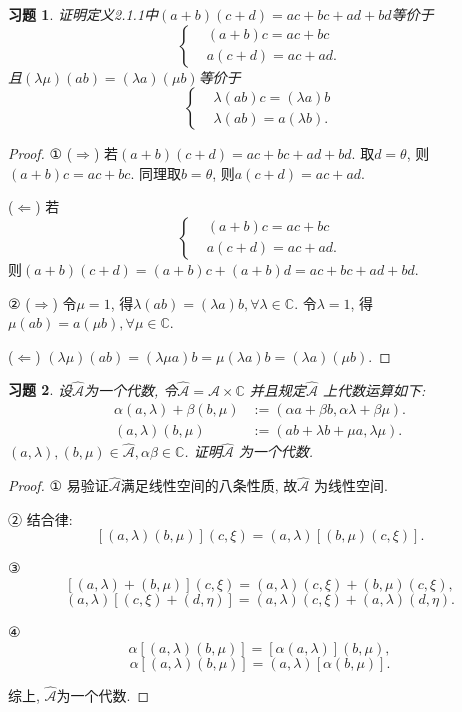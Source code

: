 \documentclass[UTF8,twoside]{ctexbook}
\newtheorem{exercise}{习题}[section]
\newcommand{\h}{\mathscr}
\newcommand{\kx}{\mathbb}
\numberwithin{equation}{section}
\begin{document}
	\begin{exercise}
		证明定义2.1.1中$(a+b)(c+d)=ac+bc+ad+bd$等价于
		\[
		\left\{
		\begin{aligned}
		&(a+b)c=ac+bc\\
		&a(c+d)=ac+ad.
		\end{aligned}
		\right.
		\]
		且$(\lambda\mu)(ab)=(\lambda a)(\mu b)$等价于
		\[
		\left\{
		\begin{aligned}
		&\lambda(ab)c=(\lambda a)b\\
		&\lambda(ab)=a(\lambda b).
		\end{aligned}
		\right.
		\]
	\end{exercise}
	\begin{proof}
		① ($\Rightarrow$) 若$(a+b)(c+d)=ac+bc+ad+bd$. 取$d=\theta$, 则$(a+b)c=ac+bc$. 同理取$b=\theta$, 则$a(c+d)=ac+ad$.

		($\Leftarrow$) 若
		\[
		\left\{
		\begin{aligned}
		&(a+b)c=ac+bc\\
		&a(c+d)=ac+ad.
		\end{aligned}
		\right.
		\]
		则$(a+b)(c+d)=(a+b)c+(a+b)d=ac+bc+ad+bd$.

		② ($\Rightarrow$) 令$\mu=1$, 得$\lambda(ab)=(\lambda a)b,\forall\lambda\in\kx C$. 令$\lambda = 1$, 得$\mu(ab)=a(\mu b),\forall \mu\in\kx C$.

		($\Leftarrow$) $(\lambda\mu)(ab)=(\lambda\mu a)b=\mu (\lambda a)b=(\lambda a)(\mu b)$.
	\end{proof}

	\begin{exercise}
		设$\hat{\h A}$为一个代数, 令$\hat{\h A}=\h A\times\kx C$ 并且规定$\hat{\h A}$ 上代数运算如下:
		\[
		\begin{aligned}
		\alpha(a,\lambda)+\beta(b,\mu)&:=(\alpha a+\beta b,\alpha\lambda + \beta\mu).\\
		(a,\lambda)(b,\mu)&:=(ab+\lambda b+\mu a,\lambda\mu).
		\end{aligned}
		\]
		$(a,\lambda), (b,\mu)\in\hat{\h A},\alpha\beta\in\kx C$. 证明$\hat{\h A}$ 为一个代数.
	\end{exercise}
	\begin{proof}
		① 易验证$\hat{\h A}$满足线性空间的八条性质, 故$\hat{\h A}$ 为线性空间.

		② 结合律:
		\[
		[(a,\lambda)(b,\mu)](c,\xi)=(a,\lambda)[(b,\mu)(c,\xi)].
		\]

		③
		\[
		[(a,\lambda)+(b,\mu)](c,\xi)=(a,\lambda)(c,\xi)+(b,\mu)(c,\xi),
		\]
		\[
		(a,\lambda)[(c,\xi)+(d,\eta)]=(a,\lambda)(c,\xi)+(a,\lambda)(d,\eta).
		\]

		④ \[
		\alpha[(a,\lambda)(b,\mu)]=[\alpha(a,\lambda)](b,\mu),
		\]
		\[
		\alpha[(a,\lambda)(b,\mu)]=(a,\lambda)[\alpha(b,\mu)].
		\]

		综上, $\hat{\h A}$为一个代数.
	\end{proof}
\end{document}
